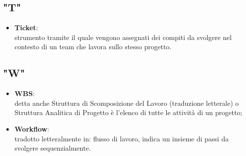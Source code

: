 \subsection{"T"}
\begin{itemize}
\item \textbf{Ticket}:\\ strumento tramite il quale vengono assegnati dei compiti da svolgere nel contesto di un team che lavora sullo stesso progetto.
\end{itemize}

\subsection{"W"}
\begin{itemize}
\item \textbf{WBS}:\\ detta anche Struttura di Scomposizione del Lavoro (traduzione letterale) o Struttura Analitica di Progetto è l'elenco di tutte le attività di un progetto;
\item \textbf{Workflow}:\\ tradotto letteralmente in: flusso di lavoro, indica un insieme di passi da svolgere sequenzialmente.
\end{itemize}

